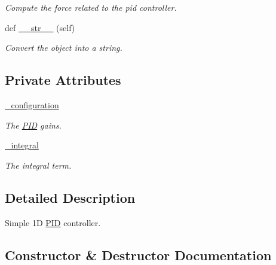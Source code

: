 \begin{DoxyCompactItemize}
\begin{DoxyCompactList}\small\item\em Compute the force related to the pid controller. \end{DoxyCompactList}\item 
\mbox{\label{classci__example__python_1_1pid_1_1PID_a55e1d7ef174e9eb02566a5b674591da7}} 
def \hyperlink{classci__example__python_1_1pid_1_1PID_a55e1d7ef174e9eb02566a5b674591da7}{\+\_\+\+\_\+str\+\_\+\+\_\+} (self)
\begin{DoxyCompactList}\small\item\em Convert the object into a string. \end{DoxyCompactList}\end{DoxyCompactItemize}
\subsection*{Private Attributes}
\begin{DoxyCompactItemize}
\item 
\hyperlink{classci__example__python_1_1pid_1_1PID_aee04c262f9b064702e13dd864f6b6f0f}{\+\_\+configuration}
\begin{DoxyCompactList}\small\item\em The \hyperlink{classci__example__python_1_1pid_1_1PID}{P\+ID} gains. \end{DoxyCompactList}\item 
\hyperlink{classci__example__python_1_1pid_1_1PID_a26b060dae844d341f5445980e869ba15}{\+\_\+integral}
\begin{DoxyCompactList}\small\item\em The integral term. \end{DoxyCompactList}\end{DoxyCompactItemize}


\subsection{Detailed Description}
Simple 1D \hyperlink{classci__example__python_1_1pid_1_1PID}{P\+ID} controller. 



\subsection{Constructor \& Destructor Documentation}
\mbox{\label{classci__example__python_1_1pid_1_1PID_a904d0150a78efa3d5a3b7483aa310776}} 
